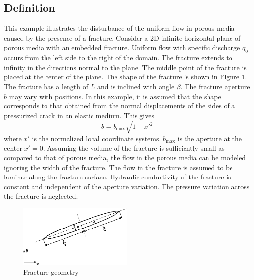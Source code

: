 \subsection{Definition}
This example illustrates the disturbance of the uniform flow in porous media caused by the presence of a fracture. 
%
Consider a 2D infinite horizontal plane of porous media with an embedded fracture. Uniform flow with specific discharge $q_0$ occurs from the left side to the right of the domain. The fracture extends to infinity in the directions normal to the plane. The middle point of the fracture is placed at the center of the plane. 
%
The shape of the fracture is shown in Figure \ref{fig:Hmf_frac}. The fracture has a length of $L$ and is inclined with angle $\beta$. 
The fracture aperture $b$ may vary with positions. In this example, it is assumed that the shape corresponds to that obtained from the normal displacements of the sides of a pressurized crack in an elastic medium. This gives
%
\begin{equation}
b = b_\mathrm{max} \sqrt{1-x'^2}	
\end{equation}
%
where $x'$ is the normalized local coordinate systems. $b_\mathrm{max}$  is the aperture at the center $x'=0$.
%
Assuming the volume of the fracture is sufficiently small as compared to that of porous media, the flow in the porous media can be modeled ignoring the width of the fracture. The flow in the fracture is assumed to be laminar along the fracture surface. Hydraulic conductivity of the fracture is constant and independent of the aperture variation. The pressure variation across the fracture is neglected.

\begin{figure}[htb]
\centering
\includegraphics[width=0.5\textwidth]{Chapter5/figure/Hmf_uniform_flow_frac}
\caption{Fracture geometry}
\label{fig:Hmf_frac}
\end{figure}

